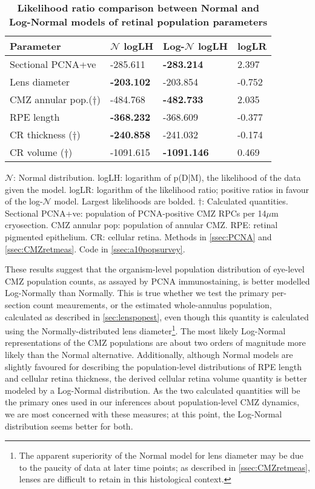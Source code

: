\begin{table}[!ht]
    \centering
    \caption{
    {\bf Likelihood ratio comparison between Normal and Log-Normal models of retinal population parameters}}
    \begin{tabular}{|l|l|l|l|}
    \hline
    {\bf Parameter} & {\bf $\mathcal{N}$ logLH} & {\bf Log-$\mathcal{N}$ logLH} & {\bf logLR} \\ \hline
    Sectional PCNA+ve & -285.611 & {\bf -283.214} & 2.397\\ \hline
    Lens diameter & {\bf -203.102} & -203.854 & -0.752\\ \hline
    CMZ annular pop.($\dagger$)  & -484.768 & {\bf -482.733} & 2.035\\ \hline
    RPE length & {\bf -368.232} & -368.609 & -0.377\\ \hline
    CR thickness ($\dagger$) & {\bf -240.858} & -241.032 & -0.174\\ \hline
    CR volume ($\dagger$) & -1091.615 & {\bf -1091.146} & 0.469\\ \hline
    \end{tabular}
    \begin{flushleft} $\mathcal{N}$: Normal distribution. logLH: logarithm of p(D|M), the likelihood of the data given the model. logLR: logarithm of the likelihood ratio; positive ratios in favour of the log-$\mathcal{N}$ model. Largest likelihoods are bolded. $\dagger$: Calculated quantities. Sectional PCNA+ve: population of PCNA-positive CMZ RPCs per 14$\mu$m cryosection. CMZ annular pop: population of annular CMZ. RPE: retinal pigmented epithelium. CR: cellular retina.
    Methods in \autoref{ssec:PCNA} and \autoref{ssec:CMZretmeas}.
    Code in \autoref{ssec:a10popsurvey}.
    \end{flushleft}
    \label{PLHRtable}
\end{table}

These results suggest that the organism-level population distribution of eye-level CMZ population counts, as assayed by PCNA immunostaining, is better modelled Log-Normally than Normally. This is true whether we test the primary per-section count meaurements, or the estimated whole-annulus population, calculated as described in \autoref{sec:lenspopest}, even though this quantity is calculated using the Normally-distributed lens diameter\footnote{The apparent superiority of the Normal model for lens diameter may be due to the paucity of data at later time points; as described in \autoref{ssec:CMZretmeas}, lenses are difficult to retain in this histological context.}. The most likely Log-Normal representations of the CMZ populations are about two orders of magnitude more likely than the Normal alternative. Additionally, although Normal models are slightly favoured for describing the population-level distributions of RPE length and cellular retina thickness, the derived cellular retina volume quantity is better modeled by a Log-Normal distribution. As the two calculated quantities will be the primary ones used in our inferences about population-level CMZ dynamics, we are most concerned with these measures; at this point, the Log-Normal distribution seems better for both.

